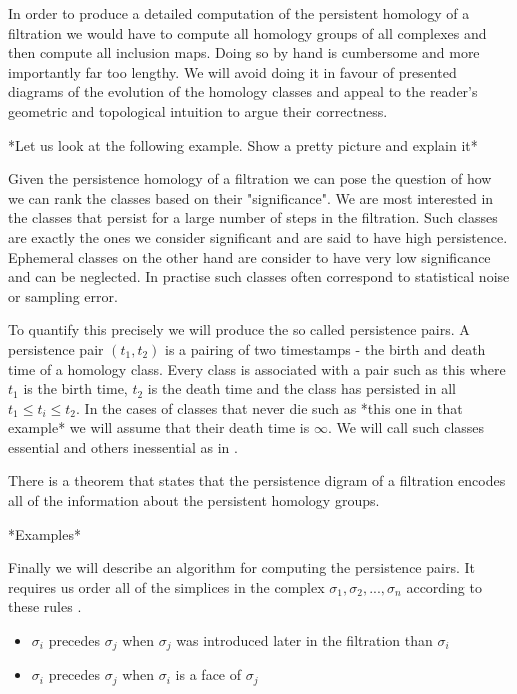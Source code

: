 In order to produce a detailed computation of the persistent homology of a filtration we would have to compute all homology groups of all complexes and then compute all inclusion maps. Doing so by hand is cumbersome and more importantly far too lengthy. We will avoid doing it in favour of presented diagrams of the evolution of the homology classes and appeal to the reader's geometric and topological intuition to argue their correctness.

*Let us look at the following example. Show a pretty picture and explain it*

Given the persistence homology of a filtration we can pose the question of how we can rank the classes based on their "significance". We are most interested in the classes that persist for a large number of steps in the filtration. Such classes are exactly the ones we consider significant and are said to have high persistence. Ephemeral classes on the other hand are consider to have very low significance and can be neglected. In practise such classes often correspond to statistical noise or sampling error.



To quantify this precisely we will produce the so called persistence pairs. A persistence pair $(t_1, t_2)$ is a pairing of two timestamps - the birth and death time of a homology class. Every class is associated with a pair such as this where $t_1$ is the birth time, $t_2$ is the death time and the class has persisted in all $t_1 \le t_i \le t_2$. In the cases of classes that never die such as *this one in that example* we will assume that their death time is $\infty$. We will call such classes essential and others inessential as in \cite{comp-topo}.

There is a theorem that states that the persistence digram of a filtration encodes all of the information about the persistent homology groups.

*Examples*

Finally we will describe an algorithm for computing the persistence pairs. It requires us order all of the simplices in the complex $\sigma_1, \sigma_2, ..., \sigma_n$ according to these rules \cite{ph-a-survey}.

\begin{itemize}
    \item $\sigma_i$ precedes $\sigma_j$ when $\sigma_j$ was introduced later in the filtration than $\sigma_i$
    \item $\sigma_i$ precedes $\sigma_j$ when $\sigma_i$ is a face of $\sigma_j$
\end{itemize}

